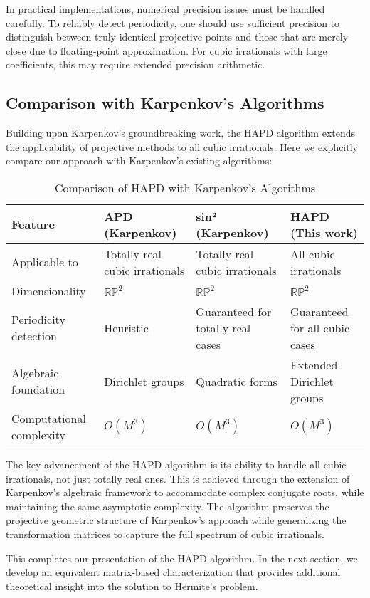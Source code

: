 \begin{remark}
In practical implementations, numerical precision issues must be handled carefully. To reliably detect periodicity, one should use sufficient precision to distinguish between truly identical projective points and those that are merely close due to floating-point approximation. For cubic irrationals with large coefficients, this may require extended precision arithmetic.
\end{remark}

\subsection{Comparison with Karpenkov's Algorithms}

Building upon Karpenkov's groundbreaking work, the HAPD algorithm extends the applicability of projective methods to all cubic irrationals. Here we explicitly compare our approach with Karpenkov's existing algorithms:

\begin{table}[h]
\centering
\caption{Comparison of HAPD with Karpenkov's Algorithms}
\label{tab:algorithm_comparison}
\begin{tabular}{|p{}|p{}|p{}|p{}|}
\hline
\textbf{Feature} & \textbf{APD (Karpenkov)} & \textbf{sin² (Karpenkov)} & \textbf{HAPD (This work)} \\
\hline
Applicable to & Totally real cubic irrationals & Totally real cubic irrationals & All cubic irrationals \\
\hline
Dimensionality & $\mathbb{RP}^2$ & $\mathbb{RP}^2$ & $\mathbb{RP}^2$ \\
\hline
Periodicity detection & Heuristic & Guaranteed for totally real cases & Guaranteed for all cubic cases \\
\hline
Algebraic foundation & Dirichlet groups & Quadratic forms & Extended Dirichlet groups \\
\hline
Computational complexity & $O(M^3)$ & $O(M^3)$ & $O(M^3)$ \\
\hline
\end{tabular}
\end{table}

The key advancement of the HAPD algorithm is its ability to handle all cubic irrationals, not just totally real ones. This is achieved through the extension of Karpenkov's algebraic framework to accommodate complex conjugate roots, while maintaining the same asymptotic complexity. The algorithm preserves the projective geometric structure of Karpenkov's approach while generalizing the transformation matrices to capture the full spectrum of cubic irrationals.

This completes our presentation of the HAPD algorithm. In the next section, we develop an equivalent matrix-based characterization that provides additional theoretical insight into the solution to Hermite's problem.
